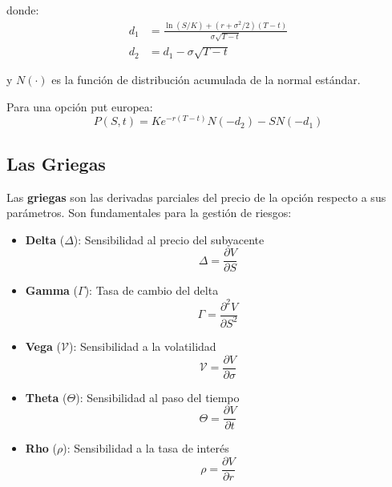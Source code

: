 donde:
\begin{align}
d_1 &= \frac{\ln(S/K) + (r + \sigma^2/2)(T-t)}{\sigma\sqrt{T-t}} \\
d_2 &= d_1 - \sigma\sqrt{T-t}
\end{align}

y $N(\cdot)$ es la función de distribución acumulada de la normal estándar.

Para una opción put europea:
\begin{equation}
P(S,t) = K e^{-r(T-t)} N(-d_2) - S N(-d_1)
\end{equation}

\subsection{Las Griegas}

Las \textbf{griegas} son las derivadas parciales del precio de la opción respecto a sus parámetros. Son fundamentales para la gestión de riesgos:

\begin{itemize}
    \item \textbf{Delta} ($\Delta$): Sensibilidad al precio del subyacente
    \begin{equation}
    \Delta = \frac{\partial V}{\partial S}
    \end{equation}
    
    \item \textbf{Gamma} ($\Gamma$): Tasa de cambio del delta
    \begin{equation}
    \Gamma = \frac{\partial^2 V}{\partial S^2}
    \end{equation}
    
    \item \textbf{Vega} ($\mathcal{V}$): Sensibilidad a la volatilidad
    \begin{equation}
    \mathcal{V} = \frac{\partial V}{\partial \sigma}
    \end{equation}
    
    \item \textbf{Theta} ($\Theta$): Sensibilidad al paso del tiempo
    \begin{equation}
    \Theta = \frac{\partial V}{\partial t}
    \end{equation}
    
    \item \textbf{Rho} ($\rho$): Sensibilidad a la tasa de interés
    \begin{equation}
    \rho = \frac{\partial V}{\partial r}
    \end{equation}
\end{itemize}

